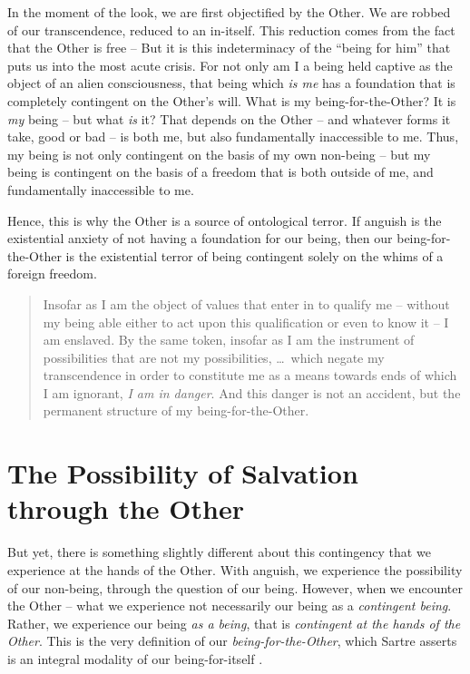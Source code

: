 In the moment of the look, we are first objectified by the Other. We are robbed of our transcendence, reduced to an in-itself. This reduction comes from the fact that the Other is free --  But it is this indeterminacy of the \enquote{being for him} that puts us into the most acute crisis. For not only am I a being held captive as the object of an alien consciousness, that being which \emph{is me} has a foundation that is completely contingent on the Other's will. What is my being-for-the-Other? It is \emph{my} being --  but what \emph{is} it? That depends on the Other -- and whatever forms it take, good or bad -- is both me, but also fundamentally inaccessible to me.  Thus, my being is not only contingent on the basis of my own non-being -- but my being is contingent on the basis of a freedom that is both outside of me, and fundamentally inaccessible to me.

Hence, this is why the Other is a source of ontological terror. If anguish is the existential anxiety of not having a foundation for our being, then our being-for-the-Other is the existential terror of being contingent solely on the whims of a foreign freedom. 

\blockcquote[366]{Sartre}{Insofar as I am the object of values that enter in to qualify me -- without my being able either to act upon this qualification or even to know it -- I am enslaved. By the same token, insofar as I am the instrument of possibilities that are not my possibilities, \ldots\ which negate my transcendence in order to constitute me as a means towards ends of which I am ignorant, \emph{I am in danger}. And this danger is not an accident, but the permanent structure of my being-for-the-Other.}

\section{The Possibility of Salvation through the Other}

\noindent
But yet, there is something slightly different about this contingency that we experience at the hands of the Other. With anguish, we experience the possibility of our non-being, through the question of our being. However, when we encounter the Other -- what we experience not necessarily our being as a \emph{contingent being}. Rather, we experience our being \emph{as a being}, that is \emph{contingent at the hands of the Other}. This is the very definition of our \emph{being-for-the-Other}, which Sartre asserts is an integral modality of our being-for-itself \autocite[479]{Sartre}.

